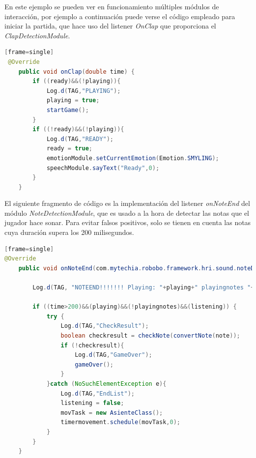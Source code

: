 En este ejemplo se pueden ver en funcionamiento múltiples módulos de interacción, por ejemplo a continuación puede verse el código empleado para iniciar la partida, que hace uso del listener \textit{OnClap} que proporciona el \textit{ClapDetectionModule}.

\vspace{5mm} %

\begin{lstlisting}[language=Java][frame=single]
 @Override
    public void onClap(double time) {
        if ((ready)&&(!playing)){
            Log.d(TAG,"PLAYING");
            playing = true;
            startGame();
        }
        if ((!ready)&&(!playing)){
            Log.d(TAG,"READY");
            ready = true;
            emotionModule.setCurrentEmotion(Emotion.SMYLING);
            speechModule.sayText("Ready",0);
        }
    }

\end{lstlisting}

\vspace{5mm} %

El siguiente fragmento de código es la implementación del listener \textit{onNoteEnd} del módulo \textit{NoteDetectionModule}, que es usado a la hora de detectar las notas que el jugador hace sonar. Para evitar falsos positivos, solo se tienen en cuenta las notas cuya duración supera los 200 milisegundos.

 \vspace{5mm} %
 
\begin{lstlisting}[language=Java][frame=single]
@Override
    public void onNoteEnd(com.mytechia.robobo.framework.hri.sound.noteDetection.Note note, long time) {

        Log.d(TAG, "NOTEEND!!!!!!! Playing: "+playing+" playingnotes "+playingnotes+" listening "+listening);

        if ((time>200)&&(playing)&&(!playingnotes)&&(listening)) {
            try {
                Log.d(TAG,"CheckResult");
                boolean checkresult = checkNote(convertNote(note));
                if (!checkresult){
                    Log.d(TAG,"GameOver");
                    gameOver();
                }
            }catch (NoSuchElementException e){
                Log.d(TAG,"EndList");
                listening = false;
                movTask = new AsienteClass();
                timermovement.schedule(movTask,0);
            }
        }
    }
\end{lstlisting}

